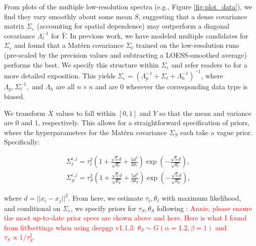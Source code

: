 \documentclass[11pt]{article}
\begin{document}
From plots of the multiple low-resolution spectra (e.g., Figure \ref{fig:plot_data}), 
we find they vary smoothly about some mean $S$, suggesting that a dense covariance 
matrix $\Sigma_\varepsilon$ (accounting for spatial dependence) may outperform a 
diagonal covariance $\Lambda_\ell^{-1}$ for $\bar Y$. In previous work, we have 
modeled multiple candidates for $\Sigma_\varepsilon$ \citep{walsh2023bayesian} and 
found that a Mat\'ern covariance $\Sigma_\ell$ trained on the low-resolution runs 
(pre-scaled by the precision values and subtracting a LOESS-smoothed average) performs 
the best. We specify this structure within $\Sigma_\varepsilon$ and refer readers 
to \cite{walsh2023bayesian} for a more detailed exposition. This yields 
$\Sigma_\varepsilon=\left(\Lambda_p^{-1} + \Sigma_\ell + \Lambda_h^{-1}\right)^{-1}$, 
where $\Lambda_p, \Sigma_\ell^{-1}, \text{ and } \Lambda_h$ are all $n\times n$ 
and are 0 wherever the corresponding data type is biased.

We transform $X$ values to fall within $[0,1]$ and $Y$ so that the mean and variance 
are 0 and 1, respectively. This allows for a straightforward specification of priors, 
where the hyperparameters for the Mat\'ern covariance $\Sigma_S$ each take a vague prior. 
Specifically:

\begin{align}
\Sigma_\ell^{i,j} = \tau_\ell^2  \left( 1 + \frac{\sqrt{5}d}{\sqrt{\theta_\ell}} + 
  \frac{5d^2}{3\theta_\ell}\right) \exp\left(-\frac{\sqrt{5}d}{\sqrt{\theta_\ell}}\right),\\
\Sigma_S^{i,j} = \tau_S^2  \left( 1 + \frac{\sqrt{5}d}{\sqrt{\theta_S}} + 
  \frac{5d^2}{3\theta_S}\right) \exp\left(-\frac{\sqrt{5}d}{\sqrt{\theta_S}}\right),
\end{align}

where $d=||x_i-x_j||^2$. From here, we estimate $\tau_\ell, \theta_\ell$ with maximum 
likelihood, and conditional on $\Sigma_\varepsilon$, we specify priors for $\tau_S, \theta_S$ 
following \cite{sauer2023active}: \textcolor{red}{Annie, please ensure the most up-to-date 
prior specs are shown above and here. Here is what I found from fit\$settings when using 
deepgp v1.1.3: $\theta_S \sim G(\alpha=1.2, \beta=1)$ and $\tau_S \propto 1/\tau_S^2$.}

\end{document}
